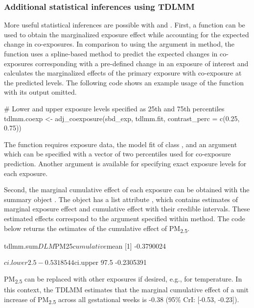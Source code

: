 \subsubsection{Additional statistical inferences using TDLMM}
More useful statistical inferences are possible with  and . First, a function  can be used to obtain the marginalized exposure effect while accounting for the expected change in co-exposures. In comparison to using the argument  in  method, the function  uses a spline-based method to predict the expected changes in co-exposures corresponding with a pre-defined change in an exposure of interest and calculates the marginalized effects of the primary exposure with co-exposure at the predicted levels. The following code shows an example usage of the function with its output omitted.
\begin{example}
# Lower and upper exposure levels specified as 25th and 75th percentiles
tdlmm.coexp <- adj_coexposure(sbd_exp, tdlmm.fit, contrast_perc = c(0.25, 0.75))
\end{example}
The function requires exposure data, the model fit of class , and an argument  which can be specified with a vector of two percentiles used for co-exposure prediction. Another argument  is available for specifying exact exposure levels for each exposure.

Second, the marginal cumulative effect of each exposure can be obtained with the summary object . The object has a list attribute , which contains estimates of marginal exposure effect and cumulative effect with their credible intervals. These estimated effects correspond to the argument  specified within  method. The code below returns the estimates of the cumulative effect of PM\textsubscript{2.5}.

\begin{example}
tdlmm.sum$DLM$PM25$cumulative
$mean
[1] -0.3790024

$ci.lower
      2.5%
-0.5318544

$ci.upper
     97.5%
-0.2305391
\end{example}
PM\textsubscript{2.5} can be replaced with other exposures if desired, e.g.,  for temperature. In this context, the TDLMM estimates that the marginal cumulative effect of a unit increase of PM\textsubscript{2.5} across all gestational weeks is -0.38 (95\% CrI: [-0.53, -0.23]).


